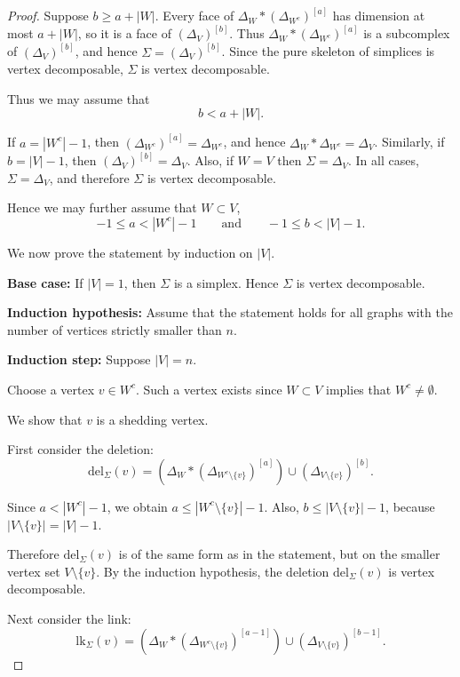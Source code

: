 \documentclass[10pt,a4paper]{amsart}
\newcommand{\del}{{\mathrm{del}}}
\newcommand{\lk}{{\mathrm{lk}}}
\begin{document}
\begin{proof}
Suppose $b \ge a+|W|$. Every face of $\Delta_W * (\Delta_{W^c})^{[a]}$ has dimension at most $a+|W|$, so it is a face of $(\Delta_V)^{[b]}$. Thus $\Delta_W * (\Delta_{W^c})^{[a]}$ is a subcomplex of $(\Delta_V)^{[b]}$, and hence $\Sigma=(\Delta_V)^{[b]}$. Since the pure skeleton of simplices is vertex decomposable, $\Sigma$ is vertex decomposable.

Thus we may assume that
\[
b<a+|W|.
\]

If $a=|W^c|-1$, then $(\Delta_{W^c})^{[a]}=\Delta_{W^c}$, and hence $\Delta_W * \Delta_{W^c} = \Delta_V$. Similarly, if $b=|V|-1$, then $(\Delta_V)^{[b]}=\Delta_V$. Also, if $W = V$ then $\Sigma = \Delta_V$. In all cases, $\Sigma=\Delta_V$, and therefore $\Sigma$ is vertex decomposable.

Hence we may further assume that $W \subset V$, 
\[
-1\le a<|W^c|-1
\qquad \text{and} \qquad
-1\le b<|V|-1.
\]

We now prove the statement by induction on $|V|$.

\medskip

\noindent
\textbf{Base case:}
If $|V|=1$, then $\Sigma$ is a simplex. Hence $\Sigma$ is vertex decomposable.

\medskip
\noindent
\textbf{Induction hypothesis:}
Assume that the statement holds for all graphs with the number of vertices strictly smaller than $n$.

\medskip

\noindent
\textbf{Induction step:}
Suppose $|V|=n$.

Choose a vertex $v \in W^c$. 
Such a vertex exists since $W \subset V$ implies that $W^c\neq \emptyset$.

We show that $v$ is a shedding vertex.

First consider the deletion:
\[
\del_\Sigma(v)
=
\left(
\Delta_W * (\Delta_{W^c\setminus\{v\}})^{[a]}
\right)
\cup
(\Delta_{V\setminus\{v\}})^{[b]}.
\]

Since $a<|W^c|-1$, we obtain $a\le |W^c\setminus\{v\}|-1$. 
Also, $b\le |V\setminus\{v\}|-1$, because $|V\setminus\{v\}|=|V|-1$.

Therefore $\del_\Sigma(v)$ is of the same form as in the statement, but on the smaller vertex set $V\setminus\{v\}$. 
By the induction hypothesis, the deletion $\del_\Sigma(v)$ is vertex decomposable.

Next consider the link:
\[
\lk_\Sigma(v)
=
\left(
\Delta_W * (\Delta_{W^c\setminus\{v\}})^{[a-1]}
\right)
\cup
(\Delta_{V\setminus\{v\}})^{[b-1]}.
\]


\end{proof}
\end{document}
